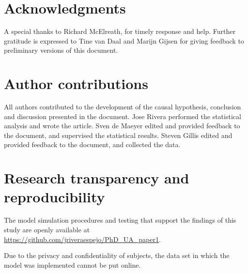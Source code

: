\section{Acknowledgments}
%
A special thanks to Richard McElreath, for timely response and help. Further gratitude is expressed to Tine van Daal and Marijn Gijsen for giving feedback to preliminary versions of this document.
%
%
\section{Author contributions}
%
All authors contributed to the development of the causal hypothesis, conclusion and discussion presented in the document. Jose Rivera performed the statistical analysis and wrote the article. Sven de Maeyer edited and provided feedback to the document, and supervised the statistical results. Steven Gillis edited and provided feedback to the document, and collected the data.
%
%
\section{Research transparency and reproducibility}
The model simulation procedures and testing that support the findings of this study are openly available at \url{https://github.com/jriveraespejo/PhD_UA_paper1}.

Due to the privacy and confidentiality of subjects, the data set in which the model was implemented cannot be put online.
%
%